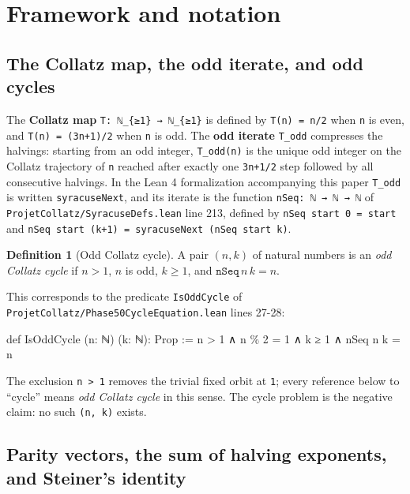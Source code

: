 \documentclass[
  11pt]{amsart}
\newenvironment{Shaded}{}{}
\newcommand{\NormalTok}[1]{#1}
\theoremstyle{plain}
\theoremstyle{definition}
\newtheorem{definition}[theorem]{Definition}
\theoremstyle{remark}
\begin{document}
\section{Framework and notation}\label{framework-and-notation}

\subsection{The Collatz map, the odd iterate, and odd
cycles}\label{the-collatz-map-the-odd-iterate-and-odd-cycles}

The \textbf{Collatz map} \texttt{T:\ ℕ\_\{≥1\}\ →\ ℕ\_\{≥1\}} is defined
by \texttt{T(n)\ =\ n/2} when \texttt{n} is even, and
\texttt{T(n)\ =\ (3n+1)/2} when \texttt{n} is odd. The \textbf{odd
iterate} \texttt{T\_odd} compresses the halvings: starting from an odd
integer, \texttt{T\_odd(n)} is the unique odd integer on the Collatz
trajectory of \texttt{n} reached after exactly one \texttt{3n+1/2} step
followed by all consecutive halvings. In the Lean 4 formalization
accompanying this paper \texttt{T\_odd} is written
\texttt{syracuseNext}, and its iterate is the function
\texttt{nSeq:\ ℕ\ →\ ℕ\ →\ ℕ} of
\texttt{ProjetCollatz/SyracuseDefs.lean} line 213, defined by
\texttt{nSeq\ start\ 0\ =\ start} and
\texttt{nSeq\ start\ (k+1)\ =\ syracuseNext\ (nSeq\ start\ k)}.

\begin{definition}[Odd Collatz cycle]
\label{def:oddcycle}
A pair $(n, k)$ of natural numbers is an \emph{odd Collatz cycle} if
$n > 1$, $n$ is odd, $k \geq 1$, and $\mathtt{nSeq}\, n\, k = n$.
\end{definition}

This corresponds to the predicate \texttt{IsOddCycle} of
\texttt{ProjetCollatz/Phase50CycleEquation.lean} lines 27-28:

\begin{Shaded}
\begin{Highlighting}[]
\NormalTok{def IsOddCycle (n: ℕ) (k: ℕ): Prop :=}
\NormalTok{  n \textgreater{} 1 ∧ n \% 2 = 1 ∧ k ≥ 1 ∧ nSeq n k = n}
\end{Highlighting}
\end{Shaded}

The exclusion \texttt{n\ \textgreater{}\ 1} removes the trivial fixed
orbit at \texttt{1}; every reference below to ``cycle'' means \emph{odd
Collatz cycle} in this sense. The cycle problem is the negative claim:
no such \texttt{(n,\ k)} exists.

\subsection{Parity vectors, the sum of halving exponents, and Steiner's
identity}\label{parity-vectors-the-sum-of-halving-exponents-and-steiners-identity}
\end{document}
